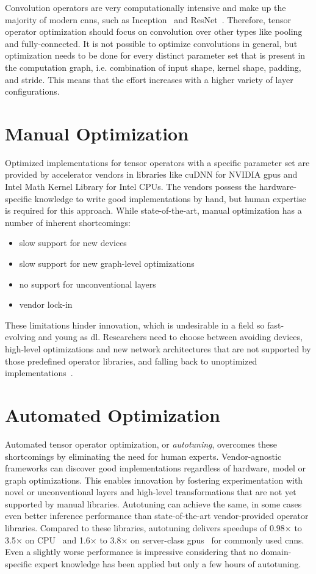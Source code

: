 Convolution operators are very computationally intensive and make up the majority of modern \glspl{cnn}, such as Inception~\cite{Szegedy.2015} and ResNet~\cite{He.2015}. Therefore, tensor operator optimization should focus on convolution over other types like pooling and fully-connected. It is not possible to optimize convolutions in general, but optimization needs to be done for every distinct parameter set that is present in the computation graph, i.e. combination of input shape, kernel shape, padding, and stride. This means that the effort increases with a higher variety of layer configurations.

\section{Manual Optimization}
Optimized implementations for tensor operators with a specific parameter set are provided by accelerator vendors in libraries like cuDNN for NVIDIA \glspl{gpu} and Intel Math Kernel Library for Intel CPUs. The vendors possess the hardware-specific knowledge to write good implementations by hand, but human expertise is required for this approach. While state-of-the-art, manual optimization has a number of inherent shortcomings:
\begin{itemize}
	\item slow support for new devices
	\item slow support for new graph-level optimizations
	\item no support for unconventional layers
	\item vendor lock-in
\end{itemize}
These limitations hinder innovation, which is undesirable in a field so fast-evolving and young as \gls{dl}. Researchers need to choose between avoiding devices, high-level optimizations and new network architectures that are not supported by those predefined operator libraries, and falling back to unoptimized implementations~\cite[p.~1]{Chen.2018b}.

\section{Automated Optimization}
Automated tensor operator optimization, or \textit{autotuning}, overcomes these shortcomings by eliminating the need for human experts. Vendor-agnostic frameworks can discover good implementations regardless of hardware, model or graph optimizations. This enables innovation by fostering experimentation with novel or unconventional layers and high-level transformations that are not yet supported by manual libraries. Autotuning can achieve the same, in some cases even better inference performance than state-of-the-art vendor-provided operator libraries. Compared to these libraries, autotuning delivers speedups of 0.98× to 3.5× on CPU~\cite[p.~9]{Liu.2019} and 1.6× to 3.8× on server-class \glspl{gpu}~\cite[p.~10]{Chen.2018b} for commonly used \glspl{cnn}. Even a slightly worse performance is impressive considering that no domain-specific expert knowledge has been applied but only a few hours of autotuning.

